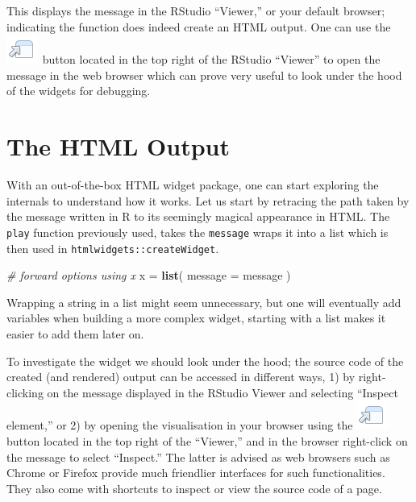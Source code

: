 \documentclass[
]{krantz}
\makeatletter
\newenvironment{Shaded}{\begin{snugshade}}{\end{snugshade}}
\newcommand{\CommentTok}[1]{\textcolor[rgb]{0.37,0.37,0.37}{\textit{#1}}}
\newcommand{\DataTypeTok}[1]{\textcolor[rgb]{0.27,0.27,0.27}{#1}}
\newcommand{\KeywordTok}[1]{\textcolor[rgb]{0.27,0.27,0.27}{\textbf{#1}}}
\newcommand{\NormalTok}[1]{#1}
\newcommand{\StringTok}[1]{\textcolor[rgb]{0.5,0.5,0.5}{#1}}
\newenvironment{kframe}{%
\medskip{}
\setlength{\fboxsep}{.8em}
 \def\at@end@of@kframe{}%
 \ifinner\ifhmode%
  \def\at@end@of@kframe{\end{minipage}}%
  \begin{minipage}{\columnwidth}%
 \fi\fi%
 \def\FrameCommand##1{\hskip\@totalleftmargin \hskip-\fboxsep
 \colorbox{shadecolor}{##1}\hskip-\fboxsep
     \hskip-\linewidth \hskip-\@totalleftmargin \hskip\columnwidth}%
 \MakeFramed {\advance\hsize-\width
   \@totalleftmargin\z@ \linewidth\hsize
   \@setminipage}}%
 {\par\unskip\endMakeFramed%
 \at@end@of@kframe}
\renewenvironment{Shaded}{\begin{kframe}}{\end{kframe}}
\makeatother
\begin{document}
This displays the message in the RStudio ``Viewer,'' or your default browser; indicating the function does indeed create an HTML output. One can use the \includegraphics{images/open-in-browser.png} button located in the top right of the RStudio ``Viewer'' to open the message in the web browser which can prove very useful to look under the hood of the widgets for debugging.

\hypertarget{widgets-first-htmloutput}{%
\section{The HTML Output}\label{widgets-first-htmloutput}}

With an out-of-the-box HTML widget package, one can start exploring the internals to understand how it works. Let us start by retracing the path taken by the message written in R to its seemingly magical appearance in HTML. The \texttt{play} function previously used, takes the \texttt{message} wraps it into a list which is then used in \texttt{htmlwidgets::createWidget}.

\begin{Shaded}
\begin{Highlighting}[]
\CommentTok{\# forward options using x}
\NormalTok{x =}\StringTok{ }\KeywordTok{list}\NormalTok{(}
  \DataTypeTok{message =}\NormalTok{ message}
\NormalTok{)}
\end{Highlighting}
\end{Shaded}

Wrapping a string in a list might seem unnecessary, but one will eventually add variables when building a more complex widget, starting with a list makes it easier to add them later on.

To investigate the widget we should look under the hood; the source code of the created (and rendered) output can be accessed in different ways, 1) by right-clicking on the message displayed in the RStudio Viewer and selecting ``Inspect element,'' or 2) by opening the visualisation in your browser using the \includegraphics{images/open-in-browser.png} button located in the top right of the ``Viewer,'' and in the browser right-click on the message to select ``Inspect.'' The latter is advised as web browsers such as Chrome or Firefox provide much friendlier interfaces for such functionalities. They also come with shortcuts to inspect or view the source code of a page.
\end{document}
